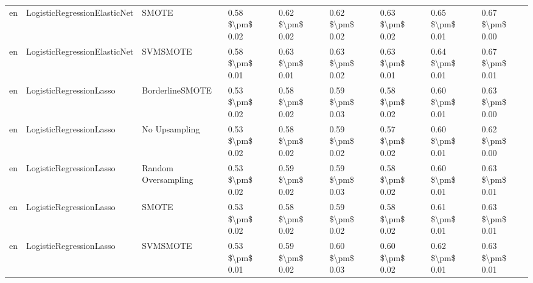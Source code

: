 \begin{tabular}{lllllllll}
      en &    LogisticRegressionElasticNet &                         SMOTE & 0.58 \$\textbackslash pm\$ 0.02 &           0.62 \$\textbackslash pm\$ 0.02 &       0.62 \$\textbackslash pm\$ 0.02 &        0.63 \$\textbackslash pm\$ 0.02 &                         0.65 \$\textbackslash pm\$ 0.01 &     0.67 \$\textbackslash pm\$ 0.00 \\
      en &    LogisticRegressionElasticNet &                      SVMSMOTE & 0.58 \$\textbackslash pm\$ 0.01 &           0.63 \$\textbackslash pm\$ 0.01 &       0.63 \$\textbackslash pm\$ 0.02 &        0.63 \$\textbackslash pm\$ 0.01 &                         0.64 \$\textbackslash pm\$ 0.01 &     0.67 \$\textbackslash pm\$ 0.01 \\
      en &         LogisticRegressionLasso &               BorderlineSMOTE & 0.53 \$\textbackslash pm\$ 0.02 &           0.58 \$\textbackslash pm\$ 0.02 &       0.59 \$\textbackslash pm\$ 0.03 &        0.58 \$\textbackslash pm\$ 0.02 &                         0.60 \$\textbackslash pm\$ 0.01 &     0.63 \$\textbackslash pm\$ 0.00 \\
      en &         LogisticRegressionLasso &                 No Upsampling & 0.53 \$\textbackslash pm\$ 0.02 &           0.58 \$\textbackslash pm\$ 0.02 &       0.59 \$\textbackslash pm\$ 0.02 &        0.57 \$\textbackslash pm\$ 0.02 &                         0.60 \$\textbackslash pm\$ 0.01 &     0.62 \$\textbackslash pm\$ 0.00 \\
      en &         LogisticRegressionLasso &           Random Oversampling & 0.53 \$\textbackslash pm\$ 0.02 &           0.59 \$\textbackslash pm\$ 0.02 &       0.59 \$\textbackslash pm\$ 0.03 &        0.58 \$\textbackslash pm\$ 0.02 &                         0.60 \$\textbackslash pm\$ 0.01 &     0.63 \$\textbackslash pm\$ 0.01 \\
      en &         LogisticRegressionLasso &                         SMOTE & 0.53 \$\textbackslash pm\$ 0.02 &           0.58 \$\textbackslash pm\$ 0.02 &       0.59 \$\textbackslash pm\$ 0.02 &        0.58 \$\textbackslash pm\$ 0.02 &                         0.61 \$\textbackslash pm\$ 0.01 &     0.63 \$\textbackslash pm\$ 0.01 \\
      en &         LogisticRegressionLasso &                      SVMSMOTE & 0.53 \$\textbackslash pm\$ 0.01 &           0.59 \$\textbackslash pm\$ 0.02 &       0.60 \$\textbackslash pm\$ 0.03 &        0.60 \$\textbackslash pm\$ 0.02 &                         0.62 \$\textbackslash pm\$ 0.01 &     0.63 \$\textbackslash pm\$ 0.01 \\

\end{tabular}
